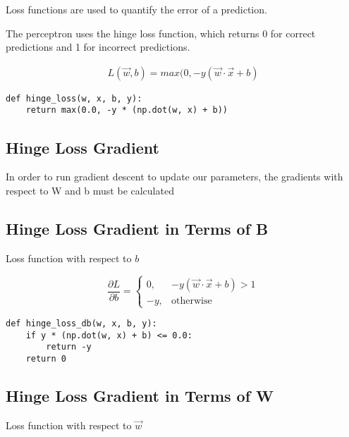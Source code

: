 \documentclass[openany]{book}
\begin{document}
Loss functions are used to quantify the error of a prediction.

The perceptron uses the hinge loss function, which returns 0 for correct
predictions and 1 for incorrect predictions.

\begin{align*}
L(\vec{w}, b) = max(0, -y(\vec{w} \cdot \vec{x} + b)
\end{align*}

\begin{tcolorbox}
\tiny
\begin{verbatim}
def hinge_loss(w, x, b, y):
    return max(0.0, -y * (np.dot(w, x) + b))
\end{verbatim}
\end{tcolorbox}

    \subsection{Hinge Loss Gradient}\label{hinge-loss-gradient}

In order to run gradient descent to update our parameters, the gradients
with respect to W and b must be calculated

    \subsection{Hinge Loss Gradient in Terms of
B}\label{hinge-loss-gradient-in-terms-of-b}

Loss function with respect to \(b\)

\[
\frac{\partial L}{\partial b} =
\begin{cases}
0, & -y (\vec{w} \cdot \vec{x} + b) > 1 \\
-y, & \text{otherwise}
\end{cases}
\]

\begin{tcolorbox}
\tiny
\begin{verbatim}
def hinge_loss_db(w, x, b, y):
    if y * (np.dot(w, x) + b) <= 0.0:
        return -y
    return 0
\end{verbatim}
\end{tcolorbox}

    \subsection{Hinge Loss Gradient in Terms of
W}\label{hinge-loss-gradient-in-terms-of-w}

Loss function with respect to \(\vec{w}\)
\end{document}

